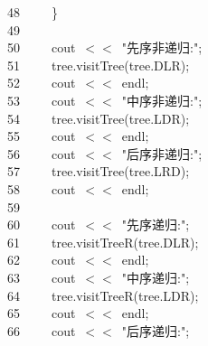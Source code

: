 \documentclass[11pt,a4paper]{ctexart}
\newcommand{\hlstd}[1]{\textcolor[rgb]{0.2,0.2,0.2}{#1}}
\newcommand{\hlstr}[1]{\textcolor[rgb]{0.06,0.58,0.63}{#1}}
\newcommand{\hlopt}[1]{\textcolor[rgb]{0.2,0.2,0.2}{#1}}
\newcommand{\hllin}[1]{\textcolor[rgb]{0.59,0.59,0.59}{#1}}
\newcommand{\hlkwd}[1]{\textcolor[rgb]{0.78,0.23,0.41}{#1}}
\begin{document}
\hllin{48\ }\hlstd{}\hlstd{\ \ \ \ }\hlstd{}\hlopt{\}}\\
\hllin{49\ }\hlstd{}\\
\hllin{50\ }\hlstd{}\hlstd{\ \ \ \ }\hlstd{cout\ }\hlopt{$<$$<$\ }\hlstd{}\hlstr{"先序非递归:"}\hlstd{}\hlopt{;}\\
\hllin{51\ }\hlstd{}\hlstd{\ \ \ \ }\hlstd{tree}\hlopt{.}\hlstd{}\hlkwd{visitTree}\hlstd{}\hlopt{(}\hlstd{tree}\hlopt{.}\hlstd{DLR}\hlopt{);}\\
\hllin{52\ }\hlstd{}\hlstd{\ \ \ \ }\hlstd{cout\ }\hlopt{$<$$<$\ }\hlstd{endl}\hlopt{;}\\
\hllin{53\ }\hlstd{}\hlstd{\ \ \ \ }\hlstd{cout\ }\hlopt{$<$$<$\ }\hlstd{}\hlstr{"中序非递归:"}\hlstd{}\hlopt{;}\\
\hllin{54\ }\hlstd{}\hlstd{\ \ \ \ }\hlstd{tree}\hlopt{.}\hlstd{}\hlkwd{visitTree}\hlstd{}\hlopt{(}\hlstd{tree}\hlopt{.}\hlstd{LDR}\hlopt{);}\\
\hllin{55\ }\hlstd{}\hlstd{\ \ \ \ }\hlstd{cout\ }\hlopt{$<$$<$\ }\hlstd{endl}\hlopt{;}\\
\hllin{56\ }\hlstd{}\hlstd{\ \ \ \ }\hlstd{cout\ }\hlopt{$<$$<$\ }\hlstd{}\hlstr{"后序非递归:"}\hlstd{}\hlopt{;}\\
\hllin{57\ }\hlstd{}\hlstd{\ \ \ \ }\hlstd{tree}\hlopt{.}\hlstd{}\hlkwd{visitTree}\hlstd{}\hlopt{(}\hlstd{tree}\hlopt{.}\hlstd{LRD}\hlopt{);}\\
\hllin{58\ }\hlstd{}\hlstd{\ \ \ \ }\hlstd{cout\ }\hlopt{$<$$<$\ }\hlstd{endl}\hlopt{;}\\
\hllin{59\ }\hlstd{}\\
\hllin{60\ }\hlstd{}\hlstd{\ \ \ \ }\hlstd{cout\ }\hlopt{$<$$<$\ }\hlstd{}\hlstr{"先序递归:"}\hlstd{}\hlopt{;}\\
\hllin{61\ }\hlstd{}\hlstd{\ \ \ \ }\hlstd{tree}\hlopt{.}\hlstd{}\hlkwd{visitTreeR}\hlstd{}\hlopt{(}\hlstd{tree}\hlopt{.}\hlstd{DLR}\hlopt{);}\\
\hllin{62\ }\hlstd{}\hlstd{\ \ \ \ }\hlstd{cout\ }\hlopt{$<$$<$\ }\hlstd{endl}\hlopt{;}\\
\hllin{63\ }\hlstd{}\hlstd{\ \ \ \ }\hlstd{cout\ }\hlopt{$<$$<$\ }\hlstd{}\hlstr{"中序递归:"}\hlstd{}\hlopt{;}\\
\hllin{64\ }\hlstd{}\hlstd{\ \ \ \ }\hlstd{tree}\hlopt{.}\hlstd{}\hlkwd{visitTreeR}\hlstd{}\hlopt{(}\hlstd{tree}\hlopt{.}\hlstd{LDR}\hlopt{);}\\
\hllin{65\ }\hlstd{}\hlstd{\ \ \ \ }\hlstd{cout\ }\hlopt{$<$$<$\ }\hlstd{endl}\hlopt{;}\\
\hllin{66\ }\hlstd{}\hlstd{\ \ \ \ }\hlstd{cout\ }\hlopt{$<$$<$\ }\hlstd{}\hlstr{"后序递归:"}\hlstd{}\hlopt{;}\\
\end{document}
